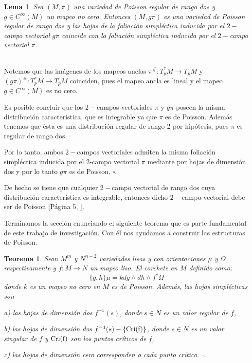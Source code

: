 \documentclass[a4paper,10pt]{book}
\newtheorem{teo}{Teorema}[chapter]
\newtheorem{lema}{Lema}[chapter]
\begin{document}
\begin{lema}\label{lema2.8} Sea $(M,\pi)$ una variedad de Poisson regular de rango dos y $g\in C^{\infty}(M)$ un mapeo no cero. Entonces $(M,g\pi)$ es una variedad de Poisson regular de rango dos y las hojas de la foliaci\'on simpl\'ectica inducida por el $2-$campo vectorial $g\pi$ coincide con la foliaci\'on simpl\'ectica inducida por el $2-$campo vectorial $\pi.$ 
\end{lema} 

\\
Notemos que las im\'agenes de los mapeos anclas $\pi^{\#}:T^{*}_{p}M\to T_{p}M$ y $(g\pi)^{\#}:T^{*}_{p}M\to T_{p}M$ coinciden, pues el mapeo ancla es lineal y el mapeo $g\in C^{\infty}(M)$ es no cero.
\vspace{5mm}

Es posible concluir que los $2-$campos vectoriales $\pi$ y $g\pi$ poseen la misma distribuci\'on caracter\'istica, que es integrable ya que $\pi$ es de Poisson. Adem\'as tenemos que \'esta es una distribuci\'on regular de rango 2 por hip\'otesis, pues $\pi$ es regular de rango dos.
\vspace{5mm}

Por lo tanto, ambos $2-$campos vectoriales admiten la misma foliaci\'on simpl\'ectica inducida por el $2$-campo vectorial $\pi$ mediante por hojas de dimensi\'on dos y por lo tanto $g\pi$ es de Poisson. \hfill $\square.$
\vspace{5mm}

De hecho se tiene que cualquier $2-$campo vectorial de rango dos cuya distribuci\'on caracter\'istica es integrable, entonces dicho $2-$campo vectorial debe ser de Poisson [P\'agina 5, \cite{GSV}].
\vspace{5mm}

Terminamos la secci\'on enunciando el siguiente teorema que es parte fundamental de este trabajo de investigaci\'on. Con \'el nos ayudamos a construir las estructuras de Poisson.

\begin{teo}\label{TeoGSV}
Sean $M^{m}$ y $N^{n-2}$ variedades lisas y con orientaciones $\mu$ y $\Omega$ respectivamente y $f:M\to N$ un mapeo liso. El corchete en $M$ definido como:
\begin{equation}\label{EcuRatiu}
\{g,h\}\mu=kdg\wedge dh\wedge f^{*}\Omega
\end{equation}
donde $k$ es un mapeo no cero en $M$ es de Poisson. Adem\'as, las hojas simpl\'ecticas son 
\begin{description}
    \item{a)} las hojas de dimensi\'on dos $f^{-1}(s)$, donde $s\in N$ es un valor regular de $f$, 
    \item{b)} las hojas de dimensi\'on dos $f^{-1}(s)-\{{\rm Cri(f)}\}$, donde $s\in N$ es un valor singular de $f$ y ${\rm Cri(f)}$ son los puntos cr\'iticos de $f$,
    \item{c)} las hojas de dimensi\'on cero corresponden a cada punto cr\'itico. \hfill $\square$.
\end{description}
\end{teo}
\end{document}
